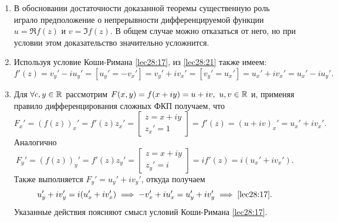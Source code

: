 \documentclass[../../main.tex]{subfiles}
\begin{document}
	
\begin{rems}

\;

\begin{enumerate}
	\item В обосновании достаточности доказанной теоремы существенную роль 
	играло предположение о непрерывности дифференцируемой функции 
	$ u = \Re f(z) $ и $ v = \Im f(z) $. В общем случае  можно отказаться 
	от него, но при условии этом доказательство значительно усложнится.
	\item Используя условие Коши-Римана \eqref{lec28:17}, из \eqref{lec28:21} 
	также имеем:
	\begin{equation}
	\label{lec29:22} 
	f'(z) = v_y' - iu_y' = \left[u_y' = -v_x'\right] =
	v_y' + iv_x' = \left[v_y' = u_x'\right] = u_x' + iv_x' = u_x' - iu_y'.
	\end{equation}
	\item Для $ \forall c, y \in \mathbb{R} $ рассмотрим 
	$ F(x, y) = f(x + iy) = u + iv,\ u, v \in \mathbb{R} $
	и, применяя правило дифференцирования сложных ФКП получаем, что 
	\[ 
	F_x' = (f(z))_x' = f'(z)z_x' = \left[
	\begin{gathered}
		z = x + iy\\
		z_x' = 1
	\end{gathered}
	\right] = f'(z) = (u + iv)_x' = u_x' + iv_x'.
	\]
	Аналогично
	\[ 
	F_y' = (f(z))_y' = f'(z)z_y' = \left[
	\begin{gathered}
	z = x + iy\\
	z_y' = i
	\end{gathered}
	\right] = if'(z) = i(u_x' + iv_x').\]
	Также выполняется $F_y' = u_y' + iv_y'$, откуда получаем
	\[u_y' + iv_y' = i(u_x' + iv_x') \implies -v_x' + iu_x' = u_y' + iv_y' 
	\implies \eqref{lec28:17}.\]
	Указанные действия поясняют смысл условий Коши-Римана \eqref{lec28:17}.
\end{enumerate}
\end{rems}
\end{document}
